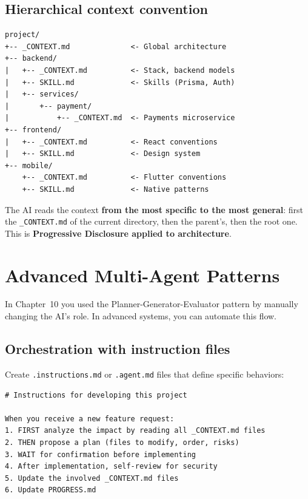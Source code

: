 \subsection{Hierarchical context convention}

\begin{lstlisting}[language={}]
project/
+-- _CONTEXT.md              <- Global architecture
+-- backend/
|   +-- _CONTEXT.md          <- Stack, backend models
|   +-- SKILL.md             <- Skills (Prisma, Auth)
|   +-- services/
|       +-- payment/
|           +-- _CONTEXT.md  <- Payments microservice
+-- frontend/
|   +-- _CONTEXT.md          <- React conventions
|   +-- SKILL.md             <- Design system
+-- mobile/
    +-- _CONTEXT.md          <- Flutter conventions
    +-- SKILL.md             <- Native patterns
\end{lstlisting}

The AI reads the context \textbf{from the most specific to the most general}: first the \texttt{\_CONTEXT.md} of the current directory, then the parent's, then the root one. This is \textbf{Progressive Disclosure applied to architecture}.

\section{Advanced Multi-Agent Patterns}

In Chapter~10 you used the Planner-Generator-Evaluator pattern by manually changing the AI's role. In advanced systems, you can automate this flow.

\subsection{Orchestration with instruction files}

Create \texttt{.instructions.md} or \texttt{.agent.md} files that define specific behaviors:

\begin{lstlisting}[language={},title={.github/copilot-instructions.md}]
# Instructions for developing this project

When you receive a new feature request:
1. FIRST analyze the impact by reading all _CONTEXT.md files
2. THEN propose a plan (files to modify, order, risks)
3. WAIT for confirmation before implementing
4. After implementation, self-review for security
5. Update the involved _CONTEXT.md files
6. Update PROGRESS.md
\end{lstlisting}

